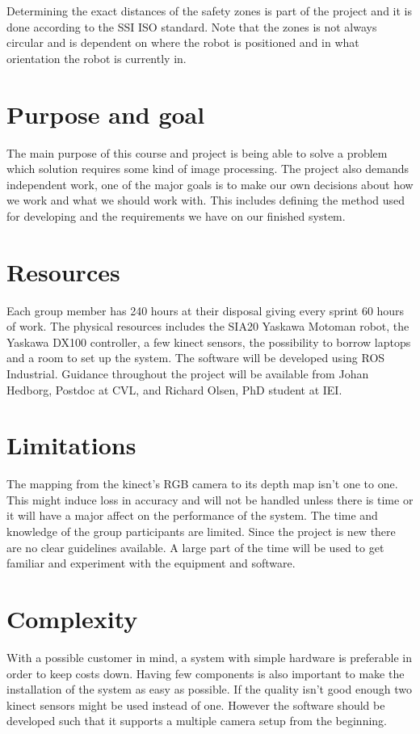 \documentclass[10pt,a4paper]{article}
\begin{document}
Determining the exact distances of the safety zones is part of the project and it is done according to the SSI ISO standard. Note that the zones is not always circular and is dependent on where the robot is positioned and in what orientation the robot is currently in.

\section{Purpose and goal}
The main purpose of this course and project is being able to solve a problem which solution requires some kind of image processing.
The project also demands independent work, one of the major goals is to make our own decisions about how we work and what we should work with. This includes defining the method used for developing and the requirements we have on our finished system.

\section{Resources}
Each group member has 240 hours at their disposal giving every sprint 60 hours of work. The physical resources includes the SIA20 Yaskawa Motoman robot, the Yaskawa DX100 controller, a few kinect sensors, the possibility to borrow laptops and a room to set up the system. 
The software will be developed using ROS Industrial.
Guidance throughout the project will be available from Johan Hedborg, Postdoc at CVL, and Richard Olsen, PhD student at IEI.

\section{Limitations}
The mapping from the kinect’s RGB camera to its depth map isn’t one to one. This might induce loss in accuracy and will not be handled unless there is time or it will have a major affect on the performance of the system. The time and knowledge of the group participants are limited. Since the project is new there are no clear guidelines available. A large part of the time will be used to get familiar and experiment with the equipment and software.

\section{Complexity}
With a possible customer in mind, a system with simple hardware is preferable in order to keep costs down. Having few components is also important to make the installation of the system as easy as possible. If the quality isn’t good enough two kinect sensors might be used instead of one. However the software should be developed such that it supports a multiple camera setup from the beginning.
\end{document}
